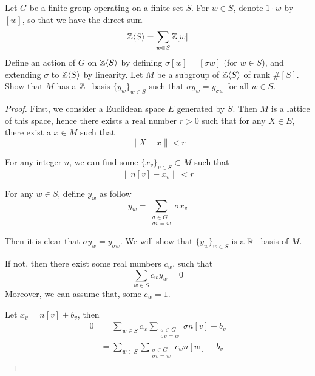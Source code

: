   \begin{ex}
    Let $G$ be a finite group operating on a finite set $S$. For $w\in S$, denote $1\cdot w$ by $[w]$, so that we have the direct sum
    \begin{equation*}
      {\mathbb Z}\langle S\rangle=\sum_{w\in S}{\mathbb Z}[w]
    \end{equation*}
    Define an action of $G$ on ${\mathbb Z}\langle S\rangle$ by defining $\sigma[w]=[\sigma w]$ (for $w\in S$), and extending $\sigma$ to ${\mathbb Z}\langle S\rangle$ by linearity. Let $M$ be a subgroup of ${\mathbb Z}\langle S\rangle$ of rank $\#[S]$. Show that $M$ has a ${\mathbb Z}-$basis $\{y_w\}_{w\in S}$ such that $\sigma y_w=y_{\sigma w}$ for all $w\in S$.
  \end{ex}
    \begin{proof}
      First, we consider a Euclidean space $E$ generated by $S$. Then $M$ is a lattice of this space, hence there exists a real number $r>0$ such that for any $X\in E$, there exist a $x\in M$ such that
      \begin{equation*}
        \|X-x\|<r
      \end{equation*}

      For any integer $n$, we can find some $\{x_v\}_{v\in S}\subset M$ such that
      \begin{equation*}
        \left\|n[v]-x_v\right\|<r
      \end{equation*}

      For any $w\in S$, define $y_w$ as follow
      \begin{equation*}
        y_w=\sum_{\substack{
                                          \sigma\in G\\
                                          \sigma v=w}}\sigma x_v
      \end{equation*}

      Then it is clear that $\sigma y_w=y_{\sigma w}$. We will show that $\{y_w\}_{w\in S}$ is a ${\mathbb R}-$basis of $M$.

      If not, then there exist some real numbers $c_w$, such that
      \begin{equation*}
        \sum_{w\in S} c_wy_w=0
      \end{equation*}
      Moreover, we can assume that, some $c_w=1$.

      Let $x_v=n[v]+b_v$, then
      \begin{align*}
        0&=\sum_{w\in S} c_w\sum_{\substack{
                                          \sigma\in G\\
                                          \sigma v=w}}\sigma n[v]+b_v\\
          &=\sum_{w\in S} \sum_{\substack{
                                          \sigma\in G\\
                                          \sigma v=w}} c_wn[w]+b_v
      \end{align*}


\end{proof}
